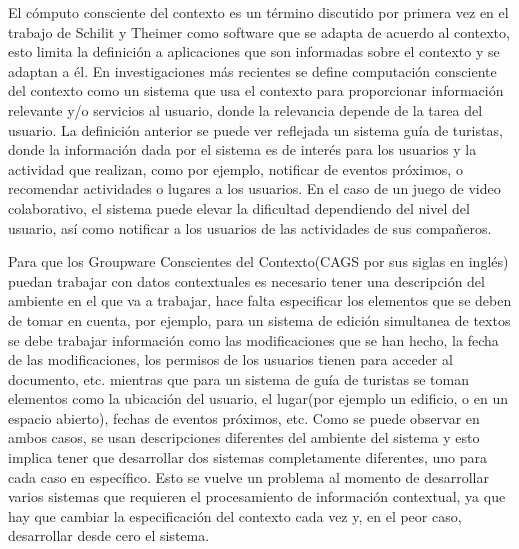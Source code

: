 El c\'omputo consciente del contexto es un t\'ermino discutido por primera vez en el trabajo de Schilit y Theimer como software que se adapta de acuerdo al contexto, esto limita la definici\'on a aplicaciones que son informadas sobre el contexto y se adaptan a \'el\citep{schillit1994disseminating}. En investigaciones m\'as recientes se define computaci\'on consciente del contexto como un sistema que usa el contexto para proporcionar informaci\'on relevante y/o servicios al usuario, donde la relevancia depende de la tarea del usuario\citep{dey2001conceptual}. La definici\'on anterior se puede ver reflejada un sistema gu\'ia de turistas, donde la informaci\'on dada por el sistema es de inter\'es para los usuarios y la actividad que realizan, como por ejemplo, notificar de eventos pr\'oximos, o recomendar actividades o lugares a los usuarios. En el caso de un juego de video colaborativo, el sistema puede elevar la dificultad dependiendo del nivel del usuario, as\'i como notificar a los usuarios de las actividades de sus compa\~neros.

Para que los Groupware Conscientes del Contexto(CAGS por sus siglas en ingl\'es) puedan trabajar con datos contextuales es necesario tener una descripci\'on del ambiente en el que va a trabajar, hace falta especificar los elementos que se deben de tomar en cuenta, por ejemplo, para un sistema de edici\'on simultanea de textos se debe trabajar informaci\'on como las modificaciones que se han hecho, la fecha de las modificaciones, los permisos de los usuarios tienen para acceder al documento, etc. mientras que para un sistema de gu\'ia de turistas se toman elementos como la ubicaci\'on del usuario, el lugar(por ejemplo un edificio, o en un espacio abierto), fechas de eventos pr\'oximos, etc. Como se puede observar en ambos casos, se usan descripciones diferentes del ambiente del sistema y esto implica tener que desarrollar dos sistemas completamente diferentes, uno para cada caso en espec\'ifico. Esto se vuelve un problema al momento de desarrollar varios sistemas que requieren el procesamiento de informaci\'on contextual, ya que hay que cambiar la especificaci\'on del contexto cada vez y, en el peor caso, desarrollar desde cero el sistema.

